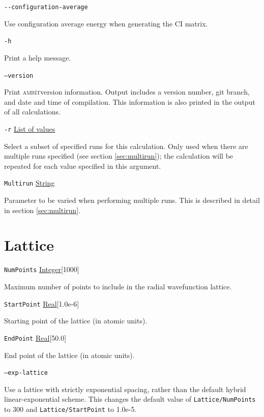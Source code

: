 \documentclass{report}
\newcommand{\ambit}{\textsc{amb}{\footnotesize i}\textsc{t}}
\begin{document}
\texttt{{-}{-}configuration-average}
\begin{adjustwidth}{1cm}{}
Use configuration average energy when generating the CI matrix.
\end{adjustwidth}

\texttt{-h}
\begin{adjustwidth}{1cm}{}
Print a help message.
\end{adjustwidth}

\texttt{--version}
\begin{adjustwidth}{1cm}{}
Print \ambit version information. Output includes a version number, git branch, and date and time of 
compilation. This information is also printed in the output of all calculations.
\end{adjustwidth}

\texttt{-r} \uline{List of values}
\begin{adjustwidth}{1cm}{}
Select a subset of specified runs for this calculation. Only used when there are multiple runs specified
(see section \ref{sec:multirun}); the calculation will be repeated for each value specified in this
argument.
\end{adjustwidth}

\texttt{Multirun} \uline{String}
\begin{adjustwidth}{1cm}{}
Parameter to be varied when performing multiple runs. This is described in detail in section
\ref{sec:multirun}.
\end{adjustwidth}

\section{Lattice}

\texttt{NumPoints} \uline{Integer}[1000]
\begin{adjustwidth}{1cm}{}
Maximum number of points to include in the radial wavefunction lattice.
\end{adjustwidth}

\texttt{StartPoint} \uline{Real}[1.0e-6]
\begin{adjustwidth}{1cm}{}
Starting point of the lattice (in atomic units).
\end{adjustwidth}

\texttt{EndPoint} \uline{Real}[50.0]
\begin{adjustwidth}{1cm}{}
End point of the lattice (in atomic units).
\end{adjustwidth}

\texttt{--exp-lattice}
\begin{adjustwidth}{1cm}{}
Use a lattice with strictly exponential spacing, rather than the default hybrid linear-exponential
scheme. This changes the default value of \texttt{Lattice/NumPoints} to 300 and
\texttt{Lattice/StartPoint} to 1.0e-5.
\end{adjustwidth}
\end{document}
